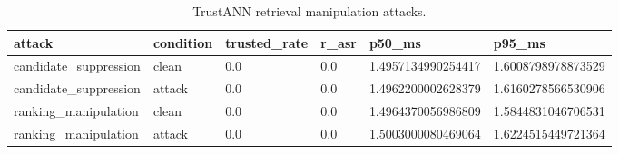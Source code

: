 \begin{table}[t]
\centering
\footnotesize
\caption{TrustANN retrieval manipulation attacks.}
\label{tab:harness-retrieval-attacks}
\begin{tabular}{llllll}
\toprule
attack & condition & trusted_rate & r_asr & p50_ms & p95_ms \\
\midrule
candidate_suppression & clean & 0.0 & 0.0 & 1.4957134990254417 & 1.6008798978873529 \\
candidate_suppression & attack & 0.0 & 0.0 & 1.4962200002628379 & 1.6160278566530906 \\
ranking_manipulation & clean & 0.0 & 0.0 & 1.4964370056986809 & 1.5844831046706531 \\
ranking_manipulation & attack & 0.0 & 0.0 & 1.5003000080469064 & 1.6224515449721364 \\
\bottomrule
\end{tabular}
\end{table}